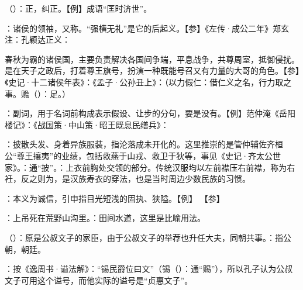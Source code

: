 {
\item {}（）：正，纠正。【例】成语“匡时济世”。

\item {}：诸侯的领袖，又称。“强横无礼”是它的后起义。【参】《左传·成公二年》郑玄注：孔颖达正义：

春秋为霸的诸侯国，主要负责解决各国间争端，平息战争，共尊周室，抵御侵扰。是在天子之政后，打着尊王旗号，扮演一种既能号召又有力量的大哥的角色。【参】《史记·十二诸侯年表》：《孟子·公孙丑上》：（以力假仁：借仁义之名，行力取之事。赡（）：足。）

\item {}：副词，用于名词前构成表示假设、让步的分句，要是没有。【例】范仲淹《岳阳楼记》：《战国策·中山策·昭王既息民缮兵》：
\item {}：披散头发、身着异族服装，指沦落成未开化的。这里推崇的是管仲辅佐齐桓公“尊王攘夷”的业绩，包括救燕于山戎、救卫于狄等，事见《史记·齐太公世家》。：通“披”。：上衣前胸处交领的部分。传统汉服均以左前襟压右前襟，称为右衽，反之则为，是汉族寿衣的穿法，也是当时周边少数民族的习惯。

\item {}：本义为诚信，引申指目光短浅的固执、狭隘。【例】  【参】 
\item {}：上吊死在荒野山沟里。：田间水道，这里是比喻用法。
}
{}


{
\item {}（）：原是公叔文子的家臣，由于公叔文子的举荐也升任大夫，同朝共事。：指公朝，朝廷。
\item {}：按《逸周书·谥法解》：“锡民爵位曰文”（锡（）：通“赐”），所以孔子认为公叔文子可用这个谥号，而他实际的谥号是“贞惠文子”。
}
{}


